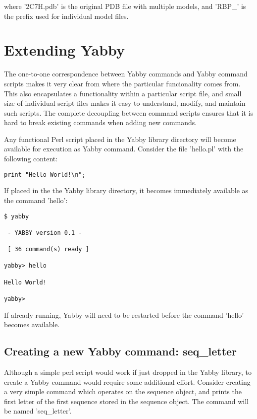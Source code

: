 where '2C7H.pdb' is the original PDB file with multiple models,
and 'RBP\_' is the prefix used for individual model files.

\section{Extending Yabby}

The one-to-one correspondence between Yabby commands and Yabby
command scripts makes it very clear from where the particular
funcionality comes from. This also encapsulates a functionality
within a particular script file, and small size of individual
script files makes it easy to understand, modify, and maintain
such scripts.  The complete decoupling between command scripts
ensures that it is hard to break existing commands when adding
new commands.

Any functional Perl script placed in the Yabby library directory
will become available for execution as Yabby command.  Consider
the file 'hello.pl' with the following content:

\begin{verbatim}
print "Hello World!\n";
\end{verbatim}

If placed in the the Yabby library directory, it becomes immediately
available as the command 'hello':

\begin{verbatim}
$ yabby

 - YABBY version 0.1 - 

 [ 36 command(s) ready ]

yabby> hello

Hello World!

yabby>
\end{verbatim}

If already running, Yabby will need to be restarted before the command
'hello' becomes available.

\subsection{Creating a new Yabby command: seq\_letter}

Although a simple perl script would work if just dropped in the Yabby
library, to create a Yabby command would require some additional effort.
Consider creating a very simple command which operates on the sequence
object, and prints the first letter of the first sequence stored in
the sequence object. The command will be named 'seq\_letter'.

